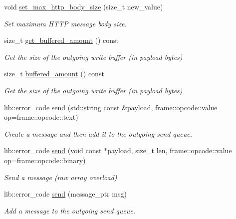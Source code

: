 \begin{DoxyCompactItemize}
void \mbox{\hyperlink{classwebsocketpp_1_1connection_ad2a5b06ad88f5bcdd06fcabaae3323bc}{set\+\_\+max\+\_\+http\+\_\+body\+\_\+size}} (size\+\_\+t new\+\_\+value)
\begin{DoxyCompactList}\small\item\em Set maximum H\+T\+TP message body size. \end{DoxyCompactList}\item 
size\+\_\+t \mbox{\hyperlink{classwebsocketpp_1_1connection_a41a23575fcdad7f8afe25b2fabe12593}{get\+\_\+buffered\+\_\+amount}} () const
\begin{DoxyCompactList}\small\item\em Get the size of the outgoing write buffer (in payload bytes) \end{DoxyCompactList}\item 
size\+\_\+t \mbox{\hyperlink{classwebsocketpp_1_1connection_aaaad6dc1c81fc944593f529575b67d96}{buffered\+\_\+amount}} () const
\begin{DoxyCompactList}\small\item\em Get the size of the outgoing write buffer (in payload bytes) \end{DoxyCompactList}\item 
lib\+::error\+\_\+code \mbox{\hyperlink{classwebsocketpp_1_1connection_af3f96a962ed7a271a00e85ba4df2db45}{send}} (std\+::string const \&payload, frame\+::opcode\+::value op=frame\+::opcode\+::text)
\begin{DoxyCompactList}\small\item\em Create a message and then add it to the outgoing send queue. \end{DoxyCompactList}\item 
lib\+::error\+\_\+code \mbox{\hyperlink{classwebsocketpp_1_1connection_a607fc1d40a2cf994ccc7173a94a2774d}{send}} (void const $\ast$payload, size\+\_\+t len, frame\+::opcode\+::value op=frame\+::opcode\+::binary)
\begin{DoxyCompactList}\small\item\em Send a message (raw array overload) \end{DoxyCompactList}\item 
lib\+::error\+\_\+code \mbox{\hyperlink{classwebsocketpp_1_1connection_a29900da403dbafab8095c0989104be90}{send}} (message\+\_\+ptr msg)
\begin{DoxyCompactList}\small\item\em Add a message to the outgoing send queue. \end{DoxyCompactList}\item 

\end{DoxyCompactItemize}
